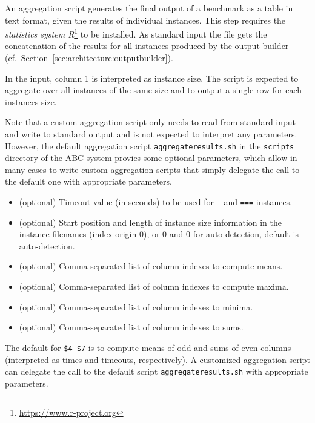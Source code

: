 \documentclass[a4paper]{article}
\newcommand{\abcs}{{ABC}}
\begin{document}
			An aggregation script
		    generates the final output of a benchmark as a table in text format,
		    given the results of individual instances.
			This step requires the \emph{statistics system R}\footnote{\url{https://www.r-project.org}} to be installed.
		    As standard input the file gets the concatenation of the results for all instances produced by the output builder (cf.~Section~\ref{sec:architecture:outputbuilder}).
	
			In the input, column 1 is interpreted as instance size. The script is expected to aggregate
			over all instances of the same size and to output a single row for each instances size.
	
			Note that a custom aggregation script only needs to read from standard input and write to standard output
			and is not expected to interpret any parameters.
			However,
			the default aggregation script {\tt aggregateresults.sh} in the {\tt scripts} directory of the \abcs{} system
			provies some optional parameters, which allow in many cases to write custom aggregation scripts
			that simply delegate the call to the default one with appropriate parameters.
	
		    \medskip{}
		    \begin{itemize}
				\item[{\tt \$1}:] (optional) Timeout value (in seconds) to be used for {\tt ---} and {\tt ===} instances.
				\item[{\tt \$2},{\tt \$3}:] (optional) Start position and length of instance size information in the instance filenames (index origin $0$),
					or $0$ and $0$ for auto-detection, default is auto-detection.
				\item[{\tt \$4}:] (optional) Comma-separated list of column indexes to compute means.
				\item[{\tt \$5}:] (optional) Comma-separated list of column indexes to compute maxima.
				\item[{\tt \$6}:] (optional) Comma-separated list of column indexes to minima.
				\item[{\tt \$7}:] (optional) Comma-separated list of column indexes to sums.
		    \end{itemize}
	
			The default for {\tt \$4-\$7}
			is to compute means of odd and sums of even columns (interpreted as times and timeouts, respectively).
			A customized aggregation script can delegate the call to the default script {\tt aggregateresults.sh} with appropriate parameters.
\end{document}
